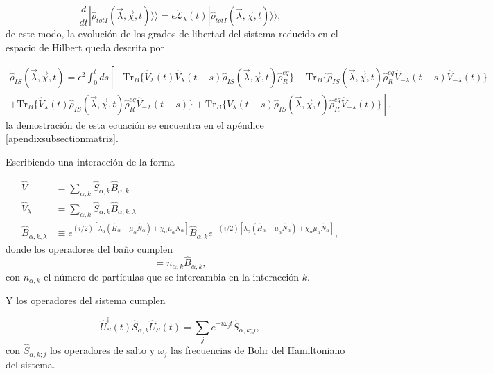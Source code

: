 \begin{equation}
    \frac{d}{dt}|\hat{\rho}_{totI}(\vec{\lambda},\vec{\chi},t)\rangle \rangle  = \epsilon \check{\mathcal{L}}_{\lambda}(t)|\hat{\rho}_{totI}(\vec{\lambda},\vec{\chi},t)\rangle \rangle,
 \label{sec2FCS:evolution}
\end{equation}
de este modo, la evolución de los grados de libertad del sistema reducido en el espacio de Hilbert queda descrita por 

\begin{multline}
    \dot{\hat{\rho}}_{IS}(\vec{\lambda},\vec{\chi},t) =  \epsilon^{2}\int_{0}^{t}ds \left[- \text{Tr}_{B}\{\hat{V}_{\lambda}(t)\hat{V}_{\lambda}(t-s)\hat{\rho}_{IS}(\vec{\lambda},\vec{\chi},t)\hat{\rho}^{eq}_{R} \} - \text{Tr}_{B}\{\hat{\rho}_{IS}(\vec{\lambda},\vec{\chi},t)\hat{\rho}^{eq}_{R}\hat{V}_{-\lambda}(t-s)\hat{V}_{-\lambda}(t) \} \right.\\
    \left. + \text{Tr}_{B}\{\hat{V}_{\lambda}(t)\hat{\rho}_{IS}(\vec{\lambda},\vec{\chi},t)\hat{\rho}^{eq}_{R}\hat{V}_{-\lambda}(t-s) \} + \text{Tr}_{B}\{ \hat{V}_{\lambda}(t-s)\hat{\rho}_{IS}(\vec{\lambda},\vec{\chi},t)\hat{\rho}^{eq}_{R}\hat{V}_{-\lambda}(t) \}  \right],
\label{ecmaestraVlambda}
\end{multline}
la demostración de esta ecuación se encuentra en el apéndice \ref{apendixsubsectionmatriz}.

Escribiendo una interacción de la forma

\begin{align*}
    \hat{V} & = \sum_{\alpha,k}\hat{S}_{\alpha,k}\hat{B}_{\alpha,k} \\
    \hat{V}_{\lambda} & = \sum_{\alpha,k}\hat{S}_{\alpha,k}\hat{B}_{\alpha,k,\lambda} \\
    \hat{B}_{\alpha,k,\lambda} & \equiv e^{(i/2)[\lambda_{\alpha}(\hat{H}_{\alpha} - \mu_{\alpha}\hat{N}_{\alpha}) + \chi_{\alpha}\mu_{\alpha}\hat{N}_{\alpha}]}\hat{B}_{\alpha,k}e^{-(i/2)[\lambda_{\alpha}(\hat{H}_{\alpha} - \mu_{\alpha}\hat{N}_{\alpha}) + \chi_{\alpha}\mu_{\alpha}\hat{N}_{\alpha}]},  
\end{align*}
donde los operadores del baño cumplen  
\begin{equation*}
    [\hat{B}_{\alpha,k},\hat{N}_{\alpha}] = n_{\alpha,k}\hat{B}_{\alpha,k},
\end{equation*}
con $n_{\alpha,k}$ el número de part\'iculas que se intercambia en la interacción $k$.
 
Y los operadores del sistema cumplen

\begin{equation*}
    \hat{U}^{\dagger}_{S}(t)\hat{S}_{\alpha,k}\hat{U}_{S}(t) = \sum_{j}e^{-i\omega_{j}t}\hat{S}_{\alpha,k;j},
\end{equation*}
con $\hat{S}_{\alpha,k;j}$ los operadores de salto y $\omega_{j}$ las frecuencias de Bohr del Hamiltoniano del sistema. 

